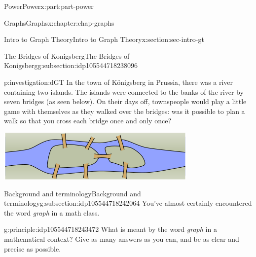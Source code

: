 \documentclass[oneside,10pt,]{book}
\numberwithin{equation}{section}
\begin{document}
\begin{partptx}{Power}{}{Power}{}{}{x:part:part-power}
\begin{chapterptx}{Graphs}{}{Graphs}{}{}{x:chapter:chap-graphs}
%
\begin{sectionptx}{Intro to Graph Theory}{}{Intro to Graph Theory}{}{}{x:section:sec-intro-gt}
%
%
\typeout{************************************************}
\typeout{************************************************}
%
\begin{subsectionptx}{The Bridges of Konigsberg}{}{The Bridges of Konigsberg}{}{}{g:subsection:idp105544718238096}
\begin{investigation}{}{p:investigation:dGT}%
%
%
%
%
%
%
In the town of Königsberg in Prussia, there was a river containing two islands. The islands were connected to the banks of the river by seven bridges (as seen below). On their days off, townspeople would play a little game with themselves as they walked over the bridges: was it possible to plan a walk so that you cross each bridge once and only once?%
\begin{sidebyside}{1}{0.1}{0.1}{0}%
\begin{sbspanel}{0.8}%
\includegraphics[width=\linewidth]{./images/gt-bridges-art.png}
\end{sbspanel}%
\end{sidebyside}%
\end{investigation}%
\end{subsectionptx}
%
%
\typeout{************************************************}
\typeout{************************************************}
%
\begin{subsectionptx}{Background and terminology}{}{Background and terminology}{}{}{g:subsection:idp105544718242064}
You've almost certainly encountered the word \emph{graph} in a math class.%
\begin{principle}{}{}{g:principle:idp105544718243472}%
What is meant by the word \emph{graph} in a mathematical context? Give as many answers as you can, and be as clear and precise as possible.%
\end{principle}

\end{subsectionptx}
\end{sectionptx}
\end{chapterptx}
\end{partptx}
\end{document}
